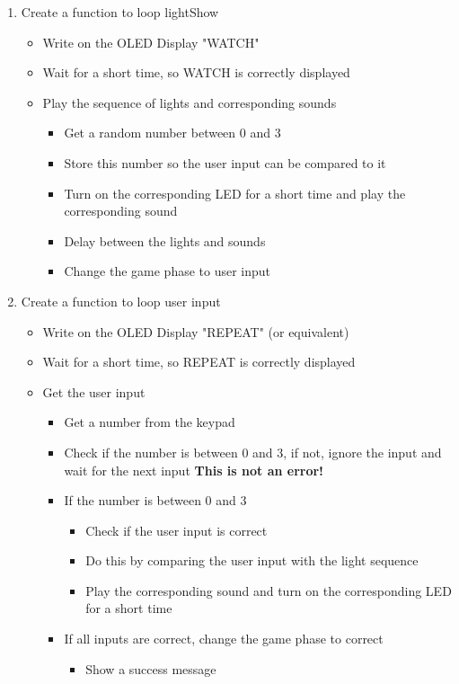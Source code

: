 \documentclass[10pt, oneside]{article}
\theoremstyle{remark}
\begin{document}
\begin{enumerate}
  \item Create a function to loop lightShow
  \begin{itemize}
    \item Write on the OLED Display "WATCH"
    \item Wait for a short time, so WATCH is correctly displayed
    \item Play the sequence of lights and corresponding sounds
    \begin{itemize}
      \item Get a random number between 0 and 3
      \item Store this number so the user input can be compared to it
      \item Turn on the corresponding LED for a short time and play the corresponding sound
      \item Delay between the lights and sounds
      \item Change the game phase to user input
    \end{itemize}
  \end{itemize}
  \item Create a function to loop user input
  \begin{itemize}
    \item Write on the OLED Display "REPEAT" (or equivalent)
    \item Wait for a short time, so REPEAT is correctly displayed
    \item Get the user input
    \begin{itemize}
      \item Get a number from the keypad
      \item Check if the number is between 0 and 3, if not, ignore the input and wait for the next input \textbf{This is not an error!}
      \item If the number is between 0 and 3
      \begin{itemize}
        \item Check if the user input is correct
        \item Do this by comparing the user input with the light sequence
        \item Play the corresponding sound and turn on the corresponding LED for a short time
      \end{itemize}
      \item If all inputs are correct, change the game phase to correct
      \begin{itemize}
        \item Show a success message

\end{itemize}
\end{itemize}
\end{itemize}
\end{enumerate}
\end{document}
